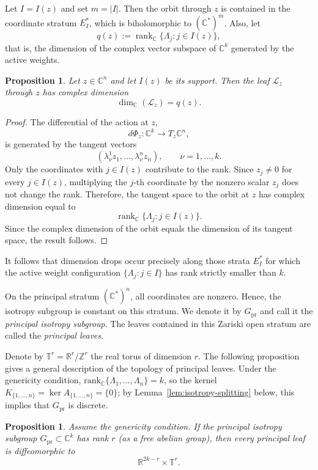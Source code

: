 \documentclass[11pt]{amsart}
\newtheorem{proposition}[theorem]{Proposition}
\theoremstyle{definition}
\theoremstyle{remark}
\newcommand{\Z}{\mathbb{Z}}
\newcommand{\C}{\mathbb{C}}
\newcommand{\R}{\mathbb{R}}
\newcommand{\T}{\mathbb{T}}
\DeclareMathOperator{\rank}{rank}
\newcommand{\lamkn}[2]{\lambda^{#2}_{#1}}
\newcommand{\leaf}[1]{\mathcal{L}_{#1}}
\newcommand{\stratSS}[1]{E_{#1}^*}
\begin{document}
Let $I=I(z)$ and set $m=|I|$.
Then the orbit through $z$ is contained in the coordinate stratum $\stratSS{I}$, which is biholomorphic to $(\C^*)^m$.
%
%
Also, let
\[
	q(z):=\rank_{\C}\{\Lambda_j:j \in I(z)\},
\]
that is, the dimension of the complex vector subspace of $\C^k$ generated by the active weights.

\begin{proposition}\label{prop:leaf-dimension}
	Let $z\in\C^n$ and let $I(z)$ be its support.
	Then the leaf $\leaf{z}$ through $z$ has complex dimension
	\[
		\dim_\C(\leaf{z})= q(z).
	\]
\end{proposition}

\begin{proof}
	The differential of the action at $z$,
	\[
		d\Phi_z:\C^k\longrightarrow T_z\C^n,
	\]
	is generated by the tangent vectors
	\[
		\left(\lamkn{\nu}{1}z_1,\ldots,\lamkn{\nu}{n}z_n\right), \qquad \nu=1,\dots,k.
	\]
	Only the coordinates with $j\in I(z)$ contribute to the rank.
	Since $z_j\neq0$ for every $j\in I(z)$, multiplying the $j$-th coordinate by the nonzero scalar $z_j$ does not change the rank.
	Therefore, the tangent space to the orbit at $z$ has complex dimension equal to
	\[
		\rank_{\C}\{\Lambda_j:j\in I(z)\}.
	\]
	Since the complex dimension of the orbit equals the dimension of its
	tangent space, the result follows.
\end{proof}

It follows that dimension drops occur precisely along those strata $\stratSS{I}$ for which the active weight configuration $\{\Lambda_j:j\in I\}$ has rank strictly smaller than $k$.

On the principal stratum $(\C^*)^n$, all coordinates are nonzero.
Hence, the isotropy subgroup is constant on this stratum.
We denote it by $G_{\mathrm{pr}}$ and call it the \emph{principal isotropy subgroup}.
The leaves contained in this Zariski open stratum are called the \emph{principal leaves}.

Denote by $\T ^r = \mathbb{R}^r / \Z^r$ the real torus of dimension $r$.
The following proposition gives a general description of the topology of principal leaves.
Under the genericity condition, $\mathrm{rank}_{\C}\{\Lambda_1,\dots,\Lambda_n\}=k$, so the kernel $K_{\{1,\dots,n\}}=\ker A_{\{1,\dots,n\}}=\{0\}$; by Lemma~\ref{lem:isotropy-splitting} below, this implies that $G_{\mathrm{pr}}$ is discrete.
\begin{proposition} \label{prop:principal-topology}
	Assume the genericity condition.
	If the principal isotropy subgroup $G_{\mathrm{pr}}\subset\C^k$ has rank $r$ (as a free abelian group), then every principal leaf is diffeomorphic to
	\[
		\R^{2k-r}\times\T^r.
	\]
\end{proposition}
\end{document}
